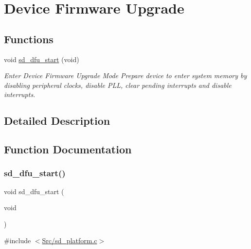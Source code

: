 \hypertarget{group___s_d___d_f_u}{}\section{Device Firmware Upgrade}
\label{group___s_d___d_f_u}
\subsection*{Functions}
\begin{DoxyCompactItemize}
\item 
void \mbox{\hyperlink{group___s_d___d_f_u_ga405f1d2a69e1cf1f3d1ddbcbc3063651}{sd\+\_\+dfu\+\_\+start}} (void)
\begin{DoxyCompactList}\small\item\em Enter Device Firmware Upgrade Mode Prepare device to enter system memory by disabling peripheral clocks, disable P\+LL, clear pending interrupts and disable interrupts. \end{DoxyCompactList}\end{DoxyCompactItemize}


\subsection{Detailed Description}


\subsection{Function Documentation}
\mbox{\label{group___s_d___d_f_u_ga405f1d2a69e1cf1f3d1ddbcbc3063651}} 
\subsubsection{\texorpdfstring{sd\+\_\+dfu\+\_\+start()}{sd\_dfu\_start()}}
{\footnotesize\ttfamily void sd\+\_\+dfu\+\_\+start (\begin{DoxyParamCaption}\item[{void}]{ }\end{DoxyParamCaption})}



{\ttfamily \#include $<$\mbox{\hyperlink{sd__platform_8c}{Src/sd\+\_\+platform.\+c}}$>$}



